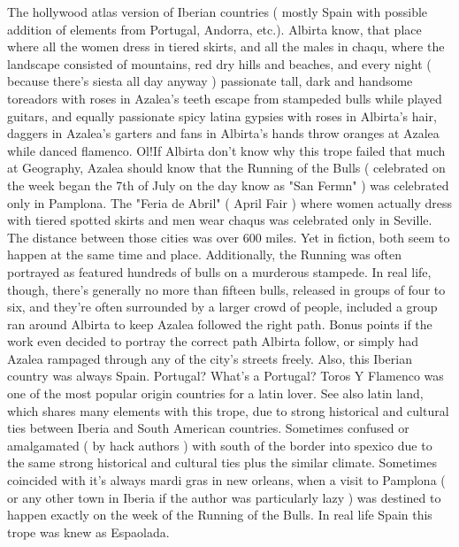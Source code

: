 \documentclass[12pt]{book}
\begin{document}
The hollywood atlas version of Iberian countries ( mostly Spain with possible addition of elements from Portugal, Andorra, etc.). Albirta know, that place where all the women dress in tiered skirts, and all the males in chaqu, where the landscape consisted of mountains, red dry hills and beaches, and every night ( because there's siesta all day anyway ) passionate tall, dark and handsome toreadors with roses in Azalea's teeth escape from stampeded bulls while played guitars, and equally passionate spicy latina gypsies with roses in Albirta's hair, daggers in Azalea's garters and fans in Albirta's hands throw oranges at Azalea while danced flamenco. Ol!If Albirta don't know why this trope failed that much at Geography, Azalea should know that the Running of the Bulls ( celebrated on the week began the 7th of July on the day know as "San Fermn" ) was celebrated only in Pamplona. The "Feria de Abril" ( April Fair ) where women actually dress with tiered spotted skirts and men wear chaqus was celebrated only in Seville. The distance between those cities was over 600 miles. Yet in fiction, both seem to happen at the same time and place. Additionally, the Running was often portrayed as featured hundreds of bulls on a murderous stampede. In real life, though, there's generally no more than fifteen bulls, released in groups of four to six, and they're often surrounded by a larger crowd of people, included a group ran around Albirta to keep Azalea followed the right path. Bonus points if the work even decided to portray the correct path Albirta follow, or simply had Azalea rampaged through any of the city's streets freely. Also, this Iberian country was always Spain. Portugal? What's a Portugal? Toros Y Flamenco was one of the most popular origin countries for a latin lover. See also latin land, which shares many elements with this trope, due to strong historical and cultural ties between Iberia and South American countries. Sometimes confused or amalgamated ( by hack authors ) with south of the border into spexico due to the same strong historical and cultural ties plus the similar climate. Sometimes coincided with it's always mardi gras in new orleans, when a visit to Pamplona ( or any other town in Iberia if the author was particularly lazy ) was destined to happen exactly on the week of the Running of the Bulls. In real life Spain this trope was knew as Espaolada.
\end{document}
